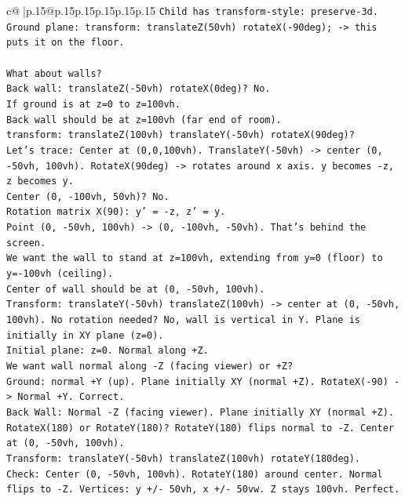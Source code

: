 \documentclass{article}
\begin{document}
{\begin{supertabular}{c@{$\;$}|p{.15\linewidth}@{}p{.15\linewidth}p{.15\linewidth}p{.15\linewidth}p{.15\linewidth}p{.15\linewidth}}
{{{\texttt{Child has transform{-}style: preserve{-}3d.} \\
\texttt{Ground plane: transform: translateZ(50vh) rotateX({-}90deg); {-}> this puts it on the floor.} \\
\\ 
\texttt{What about walls?} \\
\texttt{Back wall: translateZ({-}50vh) rotateX(0deg)? No.} \\
\texttt{If ground is at z=0 to z=100vh.} \\
\texttt{Back wall should be at z=100vh (far end of room).} \\
\texttt{transform: translateZ(100vh) translateY({-}50vh) rotateX(90deg)?} \\
\texttt{Let's trace: Center at (0,0,100vh). TranslateY({-}50vh) {-}> center (0, {-}50vh, 100vh). RotateX(90deg) {-}> rotates around x axis. y becomes {-}z, z becomes y.} \\
\texttt{Center (0, {-}100vh, 50vh)? No.} \\
\texttt{Rotation matrix X(90): y' = {-}z, z' = y.} \\
\texttt{Point (0, {-}50vh, 100vh) {-}> (0, {-}100vh, {-}50vh). That's behind the screen.} \\
\texttt{We want the wall to stand at z=100vh, extending from y=0 (floor) to y={-}100vh (ceiling).} \\
\texttt{Center of wall should be at (0, {-}50vh, 100vh).} \\
\texttt{Transform: translateY({-}50vh) translateZ(100vh) {-}> center at (0, {-}50vh, 100vh). No rotation needed? No, wall is vertical in Y. Plane is initially in XY plane (z=0).} \\
\texttt{Initial plane: z=0. Normal along +Z.} \\
\texttt{We want wall normal along {-}Z (facing viewer) or +Z?} \\
\texttt{Ground: normal +Y (up). Plane initially XY (normal +Z). RotateX({-}90) {-}> Normal +Y. Correct.} \\
\texttt{Back Wall: Normal {-}Z (facing viewer). Plane initially XY (normal +Z). RotateX(180) or RotateY(180)? RotateY(180) flips normal to {-}Z. Center at (0, {-}50vh, 100vh).} \\
\texttt{Transform: translateY({-}50vh) translateZ(100vh) rotateY(180deg).} \\
\texttt{Check: Center (0, {-}50vh, 100vh). RotateY(180) around center. Normal flips to {-}Z. Vertices: y +/{-} 50vh, x +/{-} 50vw. Z stays 100vh. Perfect.} \\
}}}
\end{supertabular}}
\end{document}
